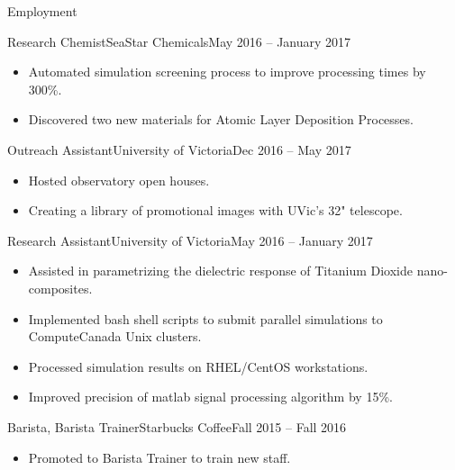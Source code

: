 \documentclass[]{mcdowellcv}
\begin{document}
	\makeheader
	
	\begin{cvsection}{Employment}
		\begin{cvsubsection}{Research Chemist}{SeaStar Chemicals}{May 2016 -- January 2017}			
			\begin{itemize}
				\item Automated simulation screening process to improve processing times by 300\%.
				\item Discovered two new materials for Atomic Layer Deposition Processes.
			\end{itemize}
		\end{cvsubsection}
		
		\begin{cvsubsection}{Outreach Assistant}{University of Victoria}{Dec 2016 -- May 2017}	
			\begin{itemize}
				\item Hosted observatory open houses.
				\item Creating a library of promotional images with UVic's 32" telescope.
			\end{itemize}
		\end{cvsubsection}
		
		\begin{cvsubsection}{Research Assistant}{University of Victoria}{May 2016 -- January 2017}		
			\begin{itemize}
				\item Assisted in parametrizing the dielectric response of Titanium Dioxide nano-composites.
				\item Implemented bash shell scripts to submit parallel simulations to ComputeCanada Unix clusters.
                \item Processed simulation results on RHEL/CentOS workstations.
                \item Improved precision of matlab signal processing algorithm by 15\%.
			\end{itemize}
		\end{cvsubsection}
		
		\begin{cvsubsection}{Barista, Barista Trainer}{Starbucks Coffee}{Fall 2015 -- Fall 2016}		
			\begin{itemize}
				\item Promoted to Barista Trainer to train new staff.
			\end{itemize}
		\end{cvsubsection}
	\end{cvsection}
	
\end{document}
